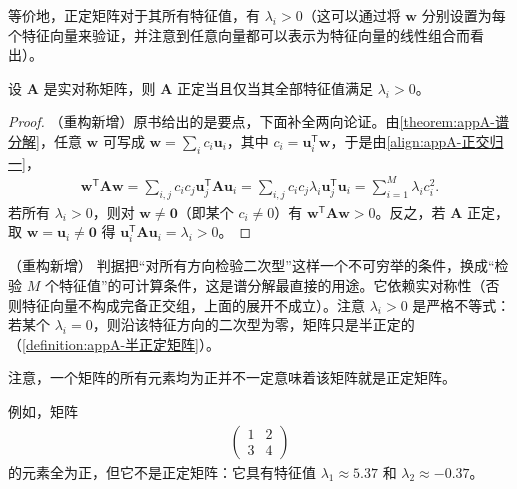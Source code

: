 \documentclass[../main.tex]{subfiles}
\begin{document}
等价地，正定矩阵对于其所有特征值，有 $\lambda_i>0$（这可以通过将 $\bm{w}$ 分别设置为每个特征向量来验证，并注意到任意向量都可以表示为特征向量的线性组合而看出）。

\begin{proposition}[正定矩阵的特征值判据]\label{proposition:appA-正定判据}
设 $\bm{A}$ 是实对称矩阵，则 $\bm{A}$ 正定当且仅当其全部特征值满足 $\lambda_i>0$。
\end{proposition}

\begin{proof}
（重构新增）原书给出的是要点，下面补全两向论证。由\cref{theorem:appA-谱分解}，任意 $\bm{w}$ 可写成 $\bm{w}=\sum_i c_i\bm{u}_i$，其中 $c_i=\bm{u}_i^{\mathsf{T}}\bm{w}$，于是由\eqref{align:appA-正交归一}，
\begin{align*}
  \bm{w}^{\mathsf{T}}\bm{A}\bm{w}=\sum_{i,j}c_ic_j\bm{u}_j^{\mathsf{T}}\bm{A}\bm{u}_i=\sum_{i,j}c_ic_j\lambda_i\bm{u}_j^{\mathsf{T}}\bm{u}_i=\sum_{i=1}^{M}\lambda_ic_i^{2}.
\end{align*}
若所有 $\lambda_i>0$，则对 $\bm{w}\neq\bm{0}$（即某个 $c_i\neq0$）有 $\bm{w}^{\mathsf{T}}\bm{A}\bm{w}>0$。反之，若 $\bm{A}$ 正定，取 $\bm{w}=\bm{u}_i\neq\bm{0}$ 得 $\bm{u}_i^{\mathsf{T}}\bm{A}\bm{u}_i=\lambda_i>0$。
\end{proof}

\begin{remark}（重构新增）
判据把“对所有方向检验二次型”这样一个不可穷举的条件，换成“检验 $M$ 个特征值”的可计算条件，这是谱分解最直接的用途。它依赖实对称性（否则特征向量不构成完备正交组，上面的展开不成立）。注意 $\lambda_i>0$ 是严格不等式：若某个 $\lambda_i=0$，则沿该特征方向的二次型为零，矩阵只是半正定的（\cref{definition:appA-半正定矩阵}）。
\end{remark}

注意，一个矩阵的所有元素均为正并不一定意味着该矩阵就是正定矩阵。

\begin{example}[ 元素全为正但非正定]\label{example:appA-元素全正非正定}
例如，矩阵
\begin{align}
  \begin{pmatrix}1&2\\3&4\end{pmatrix}
  \label{align:appA-反例矩阵}
\end{align}
的元素全为正，但它不是正定矩阵：它具有特征值 $\lambda_1\approx5.37$ 和 $\lambda_2\approx-0.37$。
\end{example}
\end{document}
